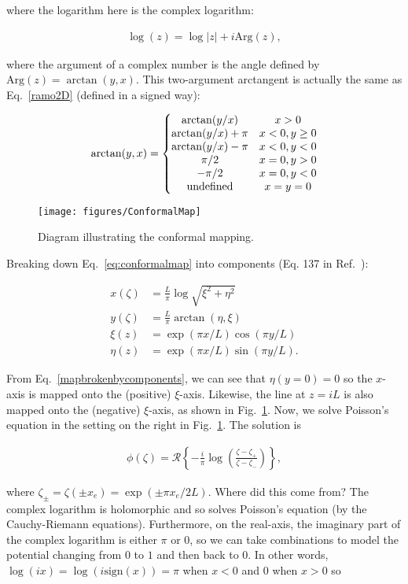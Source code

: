 \documentclass[12pt]{article}
\begin{document}
\noindent where the logarithm here is the complex logarithm:

\begin{align}
\log(z)=\log|z|+i\text{Arg}(z),
\end{align}

\noindent where the argument of a complex number is the angle defined by $\text{Arg}(z)=\arctan(y,x)$.  This two-argument arctangent is actually the same as Eq.~\ref{ramo2D} (defined in a signed way):

\begin{align}
\arctan(y,x)=\left\{\begin{matrix}\arctan(y/x) & x > 0\cr \arctan(y/x)+\pi & x <0,y\geq 0 \cr \arctan(y/x)-\pi & x<0,y<0 \cr \pi/2 & x=0,y>0 \cr -\pi/2 & x=0,y<0 \cr \text{undefined} & x=y=0\end{matrix}\right.
\end{align}

\begin{figure}[h!]
\centering
\texttt{[image: figures/ConformalMap]}
\caption{Diagram illustrating the conformal mapping.}
\label{fig:conformalmap}
\end{figure}

\noindent Breaking down Eq.~\ref{eq:conformalmap} into components (Eq. 137 in Ref.~\cite{Electrostatique}):

\begin{align}
\label{mapbrokenbycomponents}
x(\zeta)&=\frac{L}{\pi}\log\sqrt{\xi^2+\eta^2}\\
y(\zeta)&=\frac{L}{\pi}\arctan(\eta,\xi)\\
\xi(z)&=\exp(\pi x/L)\cos(\pi y/L)\\
\eta(z)&=\exp(\pi x/L)\sin(\pi y/L).
\end{align}

\noindent From Eq.~\ref{mapbrokenbycomponents}, we can see that $\eta(y=0)=0$ so the $x$-axis is mapped onto the (positive) $\xi$-axis.  Likewise, the line at $z=iL$ is also mapped onto the (negative) $\xi$-axis, as shown in Fig.~\ref{fig:conformalmap}.  Now, we solve Poisson's equation in the setting on the right in Fig.~\ref{fig:conformalmap}.  The solution is

\begin{align}
\phi(\zeta)=\mathcal{R}\left\{-\frac{i}{\pi}\log\left(\frac{\zeta-\zeta_+}{\zeta-\zeta_-}\right)\right\},
\end{align}

\noindent where $\zeta_\pm=\zeta(\pm x_e)=\exp(\pm\pi x_e/2L)$.  Where did this come from?  The complex logarithm is holomorphic and so solves Poisson's equation (by the Cauchy-Riemann equations).  Furthermore, on the real-axis, the imaginary part of the complex logarithm is either $\pi$ or $0$, so we can take combinations to model the potential changing from $0$ to $1$ and then back to $0$.  In other words, $\log(ix)=\log(i\text{sign}(x))=\pi$ when $x<0$ and $0$ when $x>0$ so
\end{document}
